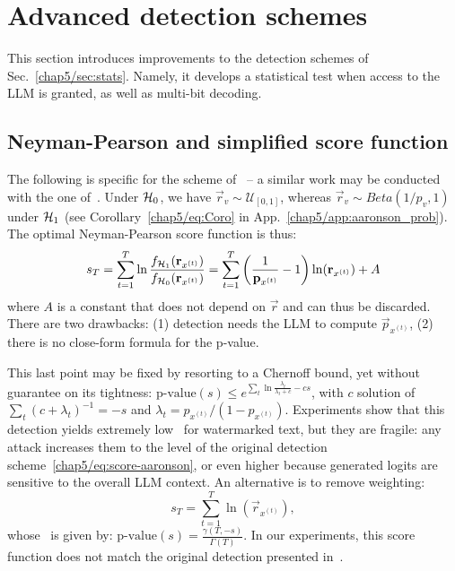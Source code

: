 


\section{Advanced detection schemes}
This section introduces improvements to the detection schemes of Sec.~\ref{chap5/sec:stats}.
Namely, it develops a statistical test when access to the LLM is granted, as well as multi-bit decoding.


\subsection{Neyman-Pearson and simplified score function} 
The following is specific for the scheme of~\citet{aaronson2023watermarking} -- a similar work may be conducted with the one of~\citet{kirchenbauer2023reliability}.
Under $\mathcal{H}_0$, we have $\vec{r}_v\sim\mathcal{U}_{[0,1]}$, whereas $\vec{r}_v\sim Beta(1/p_v,1)$ under $\mathcal{H}_1$ (see Corollary~\eqref{chap5/eq:Coro} in App.~\ref{chap5/app:aaronson_prob}). 
The optimal Neyman-Pearson score function is thus:
\begin{equation*}
    s_T = \sum_{t=1}^{T} \ln\frac{f_{\mathcal{H}_1}(\mathbf{r}_{x^{(t)}})}{f_{\mathcal{H}_0}(\mathbf{r}_{x^{(t)}})} = \sum_{t=1}^T \left(\frac{1}{\mathbf{p}_{x^{(t)}}}-1\right)\ln(\mathbf{r}_{x^{(t)}})+A
\end{equation*}
where $A$ is a constant that does not depend on $\vec{r}$ and can thus be discarded. 
There are two drawbacks: (1) detection needs the LLM to compute $\vec{p}_{x^{(t)}}$, (2) there is no close-form formula for the p-value.  

This last point may be fixed by resorting to a Chernoff bound, yet without guarantee on its tightness:
$\text{p-value}(s) \leq e^{\sum_t \ln\frac{\lambda_t}{\lambda_t + c} -cs}$,
with $c$ solution of $\sum_t (c+\lambda_t)^{-1}=-s$ and $\lambda_t = p_{x^{(t)}} / (1-p_{x^{(t)}})$.
Experiments show that this detection yields extremely low \pval\ for watermarked text, but they are fragile: any attack increases them to the level of the original detection scheme~\eqref{chap5/eq:score-aaronson}, or even higher because generated logits are sensitive to the overall LLM context. 
An alternative is to remove weighting:
\begin{equation}
 s_T = \sum_{t=1}^T \ln\left(\vec{r}_{x^{(t)}}\right),
 \label{chap5/eq:Detection2}
\end{equation}
whose \pval\ is given by: $\text{p-value}(s) = \frac{\gamma(T,-s)}{\Gamma(T)}$.
In our experiments, this score function does not match the original detection presented in~\citep{aaronson2023watermarking}.


